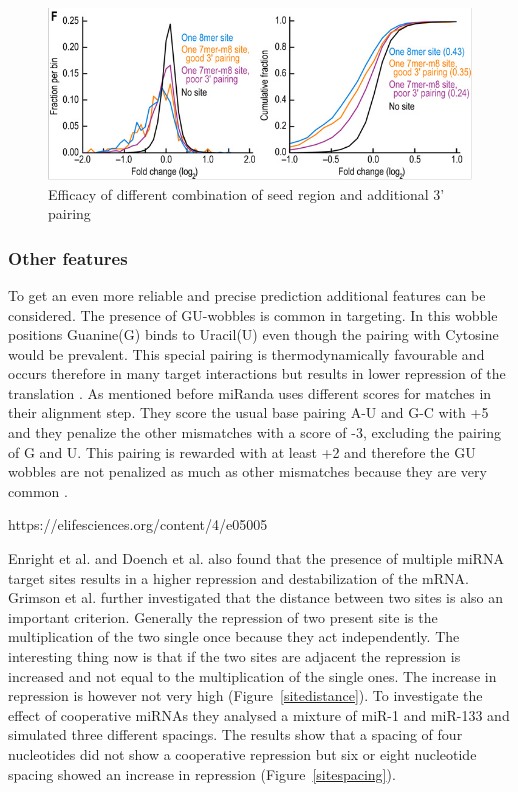 \documentclass[12pt]{article}
\begin{document}
\begin{figure}
\centering
\includegraphics[scale=0.5]{results/site_efficacy.PNG} 
\caption{Efficacy of different combination of seed region and additional 3' pairing}
\label{efficacy}
\end{figure}



\subsubsection{Other features}
To get an even more reliable and precise prediction additional features can be considered. The presence of GU-wobbles is common in targeting. In this wobble positions Guanine(G) binds to Uracil(U) even though the pairing with Cytosine would be prevalent. This special pairing is thermodynamically favourable and occurs therefore in many target interactions but results in lower repression of the translation \cite{Doench}. As mentioned before miRanda uses different scores for matches in their alignment step. They score the usual base pairing A-U and G-C with +5 and they penalize the other mismatches with a score of -3, excluding the pairing of G and U. This pairing is rewarded with at least +2 and therefore the GU wobbles are not penalized as much as other mismatches because they are very common \cite{Enright}.
 
https://elifesciences.org/content/4/e05005

Enright et al. \cite{Enright} and Doench et al. \cite{Doench} also found that the presence of multiple miRNA target sites results in a higher repression and destabilization of the mRNA. Grimson et al. \cite{Grimson} further investigated that the distance between two sites is also an important criterion. Generally the repression of two present site is the multiplication of the two single once because they act independently. The interesting thing now is that if the two sites are adjacent the repression is increased and not equal to the multiplication of the single ones. The increase in repression is however not very high (Figure~\ref{sitedistance}). To investigate the effect of cooperative miRNAs they analysed a mixture of miR-1 and miR-133 and simulated three different spacings. The results show that a spacing of four nucleotides did not show a cooperative repression but six or eight nucleotide spacing showed an increase in repression (Figure~\ref{sitespacing}).
\end{document}
